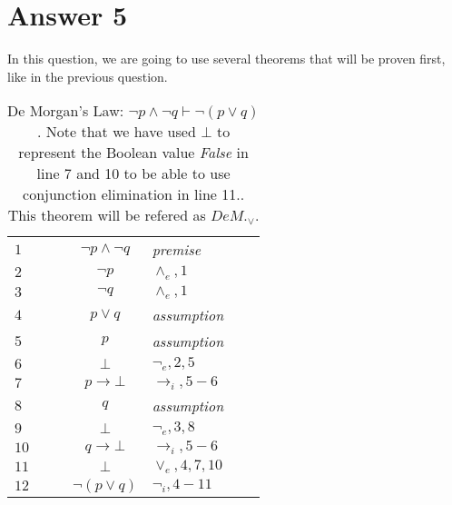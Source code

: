 \documentclass[12pt]{article}
\begin{document}
\section*{Answer 5}
In this question, we are going to use several theorems that will be proven first, like in the previous question.

\begin{table}[H]
	\centering

	\begin{tabular}{lllclll}
		$1$ & & & $\neg p \land \neg q $ & \textit{premise} & &\\
		$2$ & & & $\neg p$ & $\land _e,1$ & &\\
		$3$ & & & $\neg q$ & $\land _e,1$ & &\\\cline{2-7}
		$4$ &\multicolumn{1}{|c}{} & & $p \lor q$ & \textit{assumption} & &\multicolumn{1}{c|}{}\\\cline{3-6}
		$5$ &\multicolumn{1}{|c}{} & \multicolumn{1}{|c}{}& $p$ & \textit{assumption} &\multicolumn{1}{c|}{} &\multicolumn{1}{c|}{}\\
		$6$ &\multicolumn{1}{|c}{} & \multicolumn{1}{|c}{}& $\bot$ & $\neg _e,2,5$ &\multicolumn{1}{c|}{} &\multicolumn{1}{c|}{}\\\cline{3-6}
		$7$ &\multicolumn{1}{|c}{} & & $p \rightarrow \bot$ & $\rightarrow _i,5-6$ & &\multicolumn{1}{c|}{}\\\cline{3-6}
		$8$ &\multicolumn{1}{|c}{} & \multicolumn{1}{|c}{}& $q$ & \textit{assumption} &\multicolumn{1}{c|}{} &\multicolumn{1}{c|}{}\\
		$9$ &\multicolumn{1}{|c}{} & \multicolumn{1}{|c}{}& $\bot$ & $\neg _e,3,8$ &\multicolumn{1}{c|}{} &\multicolumn{1}{c|}{}\\\cline{3-6}
		$10$ &\multicolumn{1}{|c}{} & & $q \rightarrow \bot$ & $\rightarrow _i,5-6$ & &\multicolumn{1}{c|}{}\\
		$11$ &\multicolumn{1}{|c}{} & & $\bot$ & $\lor _e,4,7,10$ & &\multicolumn{1}{c|}{}\\\cline{2-7}
		$12$ & & & $\neg(p\lor q)$ & $\neg _i,4-11$ & &\\
		
	\end{tabular}
	
	\caption{De Morgan's Law: $\neg p \land \neg q\vdash \neg(p \lor q)$. Note that we have used $\bot$ to represent the Boolean value \textit{False} in line 7 and 10 to be able to use conjunction elimination in line 11.. This theorem will be refered as $DeM._\lor$.}
\end{table}
\end{document}
